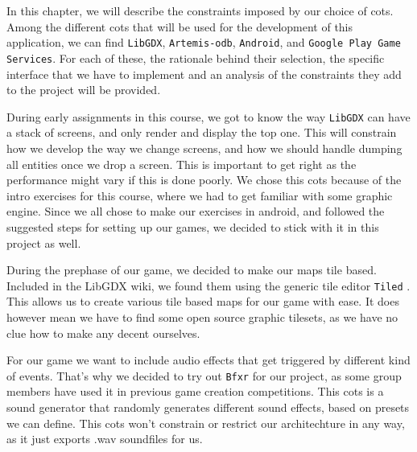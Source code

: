 
In this chapter, we will describe the constraints imposed by our choice of \gls{cots}. Among the different \gls{cots} that will be used for the development of this application, we can find \texttt{LibGDX}, \texttt{Artemis-odb}, \texttt{Android}, and \texttt{Google Play Game Services}. For each of these, the rationale behind their selection, the specific interface that we have to implement and an analysis of the constraints they add to the project will be provided.




During early assignments in this course, we got to know the way \texttt{LibGDX} \citep{libgdx} can have a stack of screens, and only render and display the top one. This will constrain how we develop the way we change screens, and how we should handle dumping all entities once we drop a screen. This is important to get right as the performance might vary if this is done poorly.
We chose this \gls{cots} because of the intro exercises for this course, where we had to get familiar with some graphic engine. Since we all chose to make our exercises in android, and followed the suggested steps for setting up our games, we decided to stick with it in this project as well.

During the prephase of our game, we decided to make our maps tile based. Included in the LibGDX wiki, we found them using the generic tile editor \texttt{Tiled} \citep{tiled}. This allows us to create various tile based maps for our game with ease. It does however mean we have to find some open source graphic tilesets, as we have no clue how to make any decent ourselves.

For our game we want to include audio effects that get triggered by different kind of events. That's why we decided to try out \texttt{Bfxr} \citep{bfxr} for our project, as some group members have used it in previous game creation competitions. This \gls{cots} is a sound generator that randomly generates different sound effects, based on presets we can define. This \gls{cots} won't constrain or restrict our architechture in any way, as it just exports .wav soundfiles for us.

